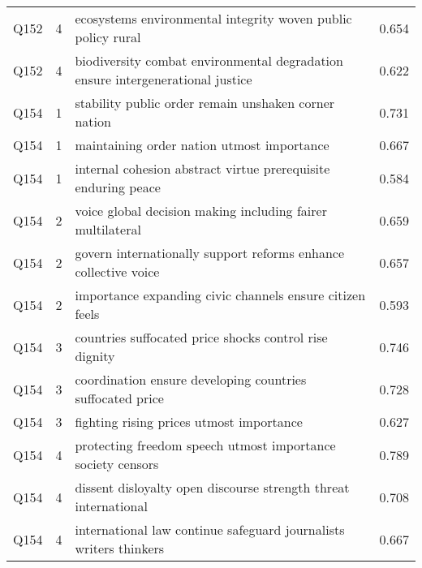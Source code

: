 \begin{longtable}{lllr}
Q152 & 4 & ecosystems environmental integrity woven public policy rural & 0.654 \\
Q152 & 4 & biodiversity combat environmental degradation ensure intergenerational justice & 0.622 \\
Q154 & 1 & stability public order remain unshaken corner nation & 0.731 \\
Q154 & 1 & maintaining order nation utmost importance & 0.667 \\
Q154 & 1 & internal cohesion abstract virtue prerequisite enduring peace & 0.584 \\
Q154 & 2 & voice global decision making including fairer multilateral & 0.659 \\
Q154 & 2 & govern internationally support reforms enhance collective voice & 0.657 \\
Q154 & 2 & importance expanding civic channels ensure citizen feels & 0.593 \\
Q154 & 3 & countries suffocated price shocks control rise dignity & 0.746 \\
Q154 & 3 & coordination ensure developing countries suffocated price & 0.728 \\
Q154 & 3 & fighting rising prices utmost importance & 0.627 \\
Q154 & 4 & protecting freedom speech utmost importance society censors & 0.789 \\
Q154 & 4 & dissent disloyalty open discourse strength threat international & 0.708 \\
Q154 & 4 & international law continue safeguard journalists writers thinkers & 0.667 \\
\end{longtable}

